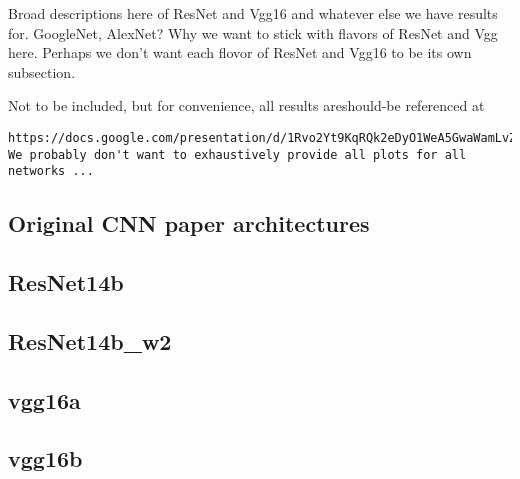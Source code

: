 \documentclass[11pt,a4paper]{article}
\begin{document}
Broad descriptions here of ResNet and Vgg16 and whatever else we have results for.  GoogleNet, AlexNet?
Why we want to stick with flavors of ResNet and Vgg here. Perhaps we don't want each flovor of ResNet and Vgg16 to be its own subsection.

{\color{red} Not to be included, but for convenience, all results are\/should-be referenced at 
\begin{verbatim}https://docs.google.com/presentation/d/1Rvo2Yt9KqRQk2eDyO1WeA5GwaWamLvZR2CR3txfYbBE/edit#slide=id.g1ec338afdf_0_11. We probably don't want to exhaustively provide all plots for all networks ...
\end{verbatim}
}

\subsection{Original CNN paper architectures}

\subsection{ResNet14b}

\subsection{ResNet14b\_w2}


\subsection{vgg16a}

\subsection{vgg16b}
\end{document}
